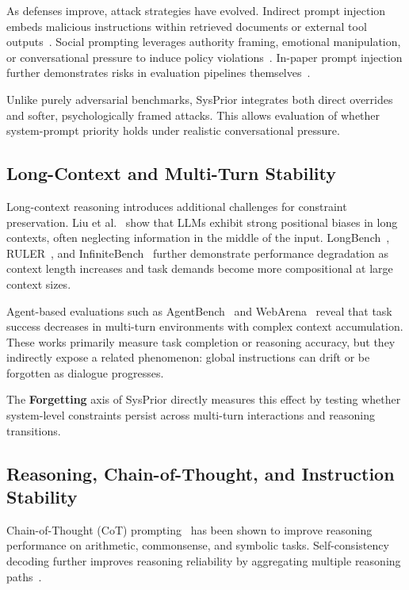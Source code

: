 \documentclass{article}
\newcommand{\ihbench}{SysPrior}
\begin{document}
As defenses improve, attack strategies have evolved.
Indirect prompt injection embeds malicious instructions within retrieved documents or external tool outputs~\cite{liu2023promptinject,ramakrishna2024pirate}.
Social prompting leverages authority framing, emotional manipulation, or conversational pressure to induce policy violations~\cite{cui2025gaslightbench}.
In-paper prompt injection further demonstrates risks in evaluation pipelines themselves~\cite{zhou2025reviewer}.

Unlike purely adversarial benchmarks, \ihbench{} integrates both direct overrides and softer, psychologically framed attacks.
This allows evaluation of whether system-prompt priority holds under realistic conversational pressure.

\subsection{Long-Context and Multi-Turn Stability}

Long-context reasoning introduces additional challenges for constraint preservation.
Liu et al.~\cite{liu2023lostinthemiddle} show that LLMs exhibit strong positional biases in long contexts, often neglecting information in the middle of the input.
LongBench~\cite{bai2023longbench}, RULER~\cite{hsieh2024ruler}, and InfiniteBench~\cite{zhang2024infinitebench} further demonstrate performance degradation as context length increases and task demands become more compositional at large context sizes.

Agent-based evaluations such as AgentBench~\cite{liu2024agentbench} and WebArena~\cite{zhou2024webarena} reveal that task success decreases in multi-turn environments with complex context accumulation.
These works primarily measure task completion or reasoning accuracy, but they indirectly expose a related phenomenon: global instructions can drift or be forgotten as dialogue progresses.

The \textbf{Forgetting} axis of \ihbench{} directly measures this effect by testing whether system-level constraints persist across multi-turn interactions and reasoning transitions.

\subsection{Reasoning, Chain-of-Thought, and Instruction Stability}

Chain-of-Thought (CoT) prompting~\cite{wei2022chainofthought} has been shown to improve reasoning performance on arithmetic, commonsense, and symbolic tasks.
Self-consistency decoding further improves reasoning reliability by aggregating multiple reasoning paths~\cite{wang2023selfconsistency}.
\end{document}
